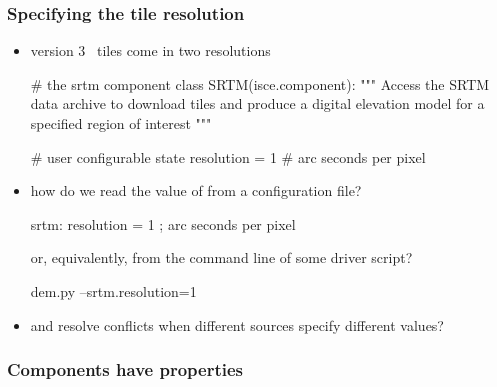 \begin{frame}[fragile]
%
  \frametitle{Specifying the tile resolution}
%
  \begin{itemize}
%
  \item version 3 \srtm\ tiles come in two resolutions
%
    \begin{ipython}[firstnumber=4]{}
# the srtm component
class SRTM(isce.component):
    """
    Access the SRTM data archive to download tiles and produce
    a digital elevation model for a specified region of interest
    """

    # user configurable state
    resolution = 1 # arc seconds per pixel

    \end{ipython}
%
  \item how do we read the value of  from a configuration file?
%
    \begin{ipfg}{}
      srtm:
          resolution = 1 ; arc seconds per pixel
    \end{ipfg}
%
    or, equivalently, from the command line of some driver script?
%
    \begin{ish}{}
      dem.py --srtm.resolution=1
    \end{ish}
%
  \item and resolve conflicts when different sources specify different values?
%
  \end{itemize}
%
\end{frame}

\begin{frame}
%
  \frametitle{Components have properties}
%
  \begin{center}
  \end{center}
%
\end{frame}

